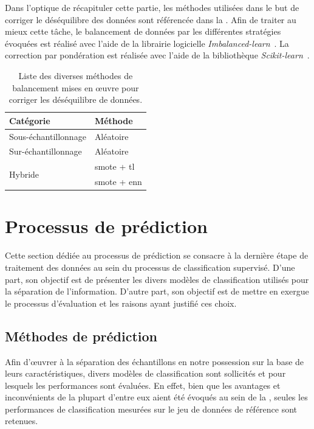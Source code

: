 Dans l'optique de récapituler cette partie, les méthodes utilisées dans le but de corriger le déséquilibre des données sont référencée dans la . Afin de traiter au mieux cette tâche, le balancement de données par les différentes stratégies évoquées est réalisé avec l'aide de la librairie logicielle \textit{Imbalanced-learn}~\cite{Lemaitre2017}. La correction par pondération est réalisée avec l'aide de la bibliothèque \textit{Scikit-learn}~\cite{pedregosa2011}.\par

\begin{table}[H]
    \centering
    \begin{tabular}{ll}
        \toprule
        \textbf{Catégorie}                  & \textbf{Méthode}          \\ \hline
        Sous-échantillonnage                & Aléatoire                 \\ \hline
        Sur-échantillonnage                 & Aléatoire                 \\ \hline
        \multirow{2}{*}{Hybride}            & \gls{smote} + \gls{tl}    \\ \cline{2-2}
                                            & \gls{smote} + \gls{enn}   \\ \bottomrule
    \end{tabular}
    \caption{Liste des diverses méthodes de balancement mises en œuvre pour corriger les déséquilibre de données.}
    \label{tab:summary_balancement_methods}
\end{table}\par

\section{Processus de prédiction}
Cette section dédiée au processus de prédiction se consacre à la dernière étape de traitement des données au sein du processus de classification supervisé. D'une part, son objectif est de présenter les divers modèles de classification utilisés pour la séparation de l'information. D'autre part, son objectif est de mettre en exergue le processus d'évaluation et les raisons ayant justifié ces choix.\par

\subsection{Méthodes de prédiction}
Afin d'œuvrer à la séparation des échantillons en notre possession sur la base de leurs caractéristiques, divers modèles de classification sont sollicités et pour lesquels les performances sont évaluées. En effet, bien que les avantages et inconvénients de la plupart d'entre eux aient été évoqués au sein de la , seules les performances de classification mesurées sur le jeu de données de référence sont retenues.\par

